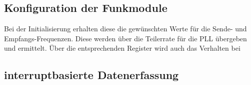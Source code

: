 \subsection{Konfiguration der Funkmodule}

 Bei der Initialisierung erhalten diese die gewünschten Werte für die Sende- und Empfangs-Frequenzen. Diese werden über die Teilerrate für die  \ac{PLL} übergeben und ermittelt. Über die entsprechenden Register wird auch das Verhalten bei




\subsection{interruptbasierte Datenerfassung}


